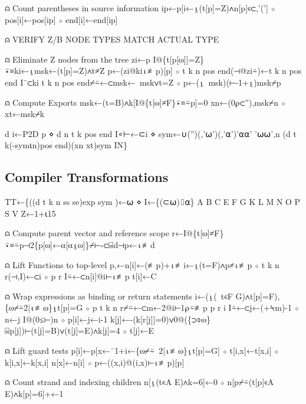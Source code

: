 \documentclass{article}%
\begin{document}
⍝ Count parentheses in source information
         ip←p[i←⍸(t[p]=Z)∧n[p]∊⊂,'('] ⋄ pos[i]←pos[ip] ⋄ end[i]←end[ip]

⍝ VERIFY Z/B NODE TYPES MATCH ACTUAL TYPE

⍝ Eliminate Z nodes from the tree
         zi←p I@\{t[p[⍵]]=Z\}⍣≡ki←⍸msk←(t[p]=Z)∧t≠Z
         p←(zi@ki⍳≢p)[p] ⋄ t k n pos end(⊣@zi⍨)←t k n pos end I¨⊂ki
         t k n pos end⌿⍨←⊂msk←~msk∨t=Z ⋄ p←(⍸~msk)(⊢-1+⍸)msk⌿p

⍝ Compute Exports
         msk←(t=B)∧k[I@\{t[⍵]≠F\}⍣≡⍨p]=0
         xn←(0⍴⊂''),msk⌿n ⋄ xt←msk⌿k

         d i←P2D p ⋄ d n t k pos end I∘⊢←⊂i ⋄ sym←∪('')(,'⍵')(,'⍺')'⍺⍺' '⍵⍵',n
         (d t k(-sym⍳n)pos end)(xn xt)sym IN\}
\nwendcode{}\nwdocspar

\subsection{Compiler Transformations}

\nwenddocs{}\endmoddef\nwstartdeflinemarkup{}\nwenddeflinemarkup
 TT←\{((d t k n ss se)exp sym )←⍵ ⋄ I←\{(⊂⍵)⌷⍺\}
         A B C E F G K L M N O P S V Z←1+⍳15

⍝ Compute parent vector and reference scope
         r←I@\{t[⍵]≠F\}⍣≡⍨p⊣2\{p[⍵]←⍺[⍺⍸⍵]\}⌿⊢∘⊂⌸d⊣p←⍳≢d

⍝ Lift Functions to top-level
         p,←n[i]←(≢p)+⍳≢i←⍸(t=F)∧p≠⍳≢p ⋄ t k n r(⊣,I)←⊂i ⋄ p r I⍨←⊂n[i]@i⊢⍳≢p
         t[i]←C

⍝ Wrap expressions as binding or return statements
         i←(⍸(~t∊F G)∧t[p]=F),\{⍵⌿⍨2|⍳≢⍵\}⍸t[p]=G ⋄ p t k n r⌿⍨←⊂m←2@i⊢1⍴⍨≢p
         p r i I⍨←⊂j←(+⍀m)-1 ⋄ n←j I@(0≤⊢)n ⋄ p[i]←j←i-1
         k[j]←-(k[r[j]]=0)∨0@(\{⊃⌽⍵\}⌸p[j])⊢(t[j]=B)∨(t[j]=E)∧k[j]=4 ⋄ t[j]←E

⍝ Lift guard tests
         p[i]←p[x←¯1+i←\{⍵⌿⍨~2|⍳≢⍵\}⍸t[p]=G] ⋄ t[i,x]←t[x,i] ⋄ k[i,x]←k[x,i]
         n[x]←n[i] ⋄ p←((x,i)@(i,x)⊢⍳≢p)[p]

⍝ Count strand and indexing children
         n[⍸(t∊A E)∧k=6]←0 ⋄ n[p⌿⍨(t[p]∊A E)∧k[p]=6]+←1
\end{document}
